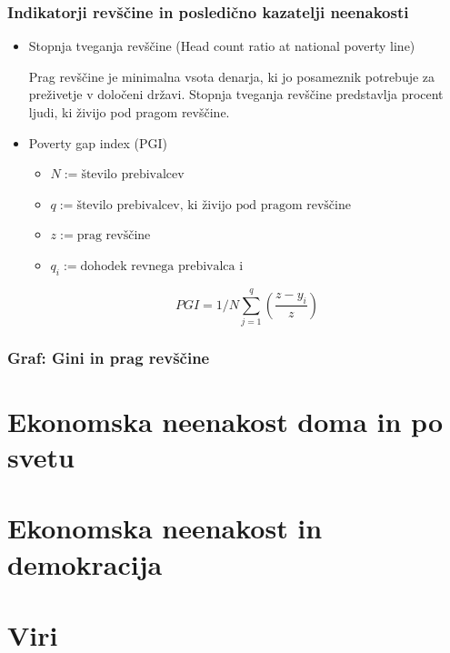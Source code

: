 \documentclass[a4paper,12 pt]{article}
\begin{document}
\subsubsection{Indikatorji revščine in posledično kazatelji neenakosti}
\begin{itemize}
\item  Stopnja tveganja revščine (Head count ratio at national poverty line)

Prag revščine je minimalna vsota denarja, ki jo posameznik potrebuje za preživetje v določeni državi. Stopnja tveganja revščine predstavlja procent ljudi, ki živijo pod pragom revščine.
\item Poverty gap index (PGI)
\begin{itemize}
\item $N := \textrm{število prebivalcev}$ 
\item $q := \textrm{število prebivalcev, ki živijo pod pragom revščine}$
\item $z := \textrm{prag revščine}$
\item $q_i := \textrm{dohodek revnega prebivalca i}$
\end{itemize}
$$
PGI = 1/N \sum_{j=1}^q (\frac{z-y_i}{z})
$$
\end{itemize}


\subsubsection{Graf: Gini in prag revščine}

\newpage

\section[Ekonomska neenakost doma in po svetu]{Ekonomska neenakost doma in po svetu}

\newpage

\section[Ekonomska neenakost in demokracija]{Ekonomska neenakost in demokracija}

\newpage

\section[Viri]{Viri}
\end{document}

